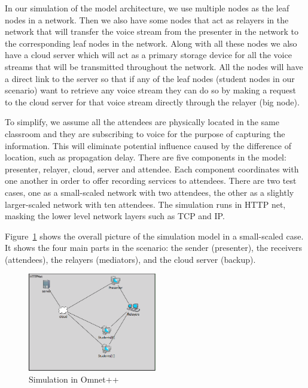 In our simulation of the model architecture, we use multiple nodes
as the leaf nodes in a network.
Then we also have some nodes that act as relayers in the network that will
transfer the voice stream from the presenter in the network to
the corresponding leaf nodes in the network. Along with all these nodes we also
have a cloud server which will act as a primary storage device for all the
voice streams that will be transmitted throughout the network. All the nodes will
have a direct link to the server so that if any of the leaf nodes (student
nodes in our scenario) want to retrieve any voice stream they can do so by
making a request to
the cloud server for that voice stream directly through the relayer (big node).

To simplify, we assume all the attendees are physically located in the same
classroom and they are subscribing to voice for the purpose of capturing the
information. This will eliminate potential influence caused by the difference
of
location, such as propagation delay. There are five components in the model:
presenter, relayer, cloud, server and attendee. Each component coordinates with
one another in order to offer recording services to attendees. There are two
test cases, one as a small-scaled network with two attendees, the other as a
slightly larger-scaled network with ten attendees. The simulation runs in HTTP net,
masking the lower level network layers such as TCP and IP.



Figure~\ref{fig:sce} shows the overall picture of the simulation model in a
small-scaled case. It shows the four main parts in the scenario: the sender (presenter), the receivers (attendees),
the relayers (mediators), and the cloud server (backup).

\begin{figure}[h!]
  \centering
    \includegraphics[width=0.5\textwidth]{figures/sce.png}
  \caption{Simulation in Omnet++}
  \label{fig:sce}
\end{figure}

